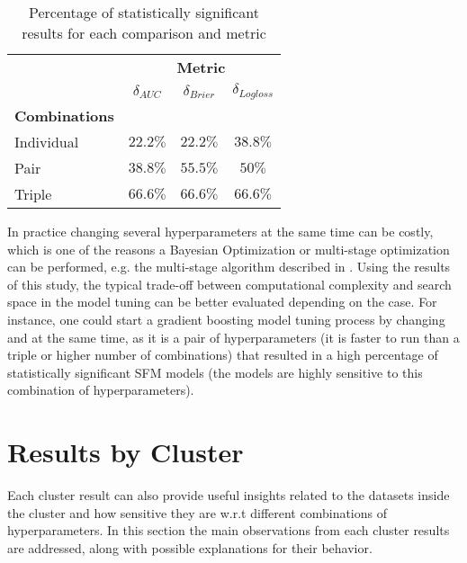 \begin{table}[H]
    \centering
    \begin{tabular}{l|lcc}
              & \multicolumn{3}{c}{\textbf{Metric}}                                 \\
              & \multicolumn{1}{c}{$\delta_{AUC}$} &  \multicolumn{1}{c}{$\delta_{Brier}$} &  \multicolumn{1}{c}{$\delta_{Logloss}$} \\
    \textbf{Combinations} &          & \multicolumn{1}{l}{} & \multicolumn{1}{l}{} \\
    \midrule
    Individual & $22.2\%$ & $22.2\%$ & $38.8\%$\\
    Pair       & $38.8\%$ & $55.5\%$ & $50\%$\\
    Triple     & $66.6\%$ & $66.6\%$ & $66.6\%$
    \end{tabular}
    \caption{Percentage of statistically significant results for each comparison and metric}
    \label{table:stats-combination}
\end{table}

In practice changing several hyperparameters at the same time can be costly, which is one of the reasons a Bayesian Optimization or multi-stage optimization can be performed, e.g. the multi-stage algorithm described in \cite{wang-etal-2015-efficient}. Using the results of this study, the typical trade-off between computational complexity and search space in the model tuning can be better evaluated depending on the case. For instance, one could start a gradient boosting model tuning process by changing  and  at the same time, as it is a pair of hyperparameters (it is faster to run than a triple or higher number of combinations) that resulted in a high percentage of statistically significant SFM models (the models are highly sensitive to this combination of hyperparameters).

    
\section{Results by Cluster}

Each cluster result can also provide useful insights related to the datasets inside the cluster and how sensitive they are w.r.t different combinations of hyperparameters. In this section the main observations from each cluster results are addressed, along with possible explanations for their behavior.

